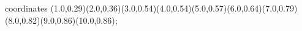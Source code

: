 					coordinates { (1.0,0.29)(2.0,0.36)(3.0,0.54)(4.0,0.54)(5.0,0.57)(6.0,0.64)(7.0,0.79)(8.0,0.82)(9.0,0.86)(10.0,0.86)};